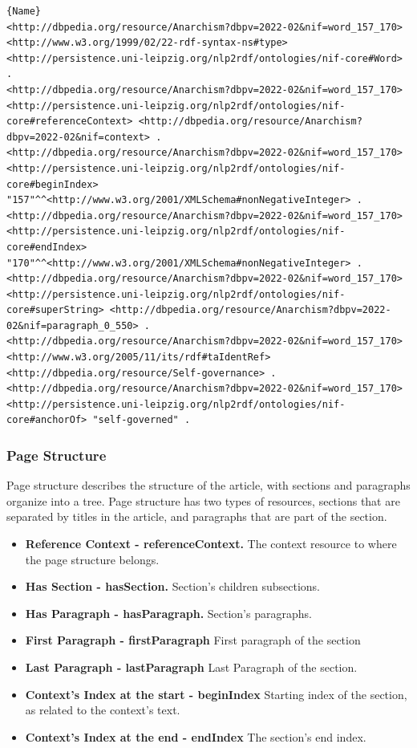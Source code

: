 \documentclass[thesis=M,english,hidelinks]{FITthesis}[2019/12/23]
\begin{document}
\begin{lstlisting}[caption=Example of an output for a Word link in NIF format,frame=tlrb,  label = {lst:nif-links}]{Name}
<http://dbpedia.org/resource/Anarchism?dbpv=2022-02&nif=word_157_170> <http://www.w3.org/1999/02/22-rdf-syntax-ns#type> <http://persistence.uni-leipzig.org/nlp2rdf/ontologies/nif-core#Word> .
<http://dbpedia.org/resource/Anarchism?dbpv=2022-02&nif=word_157_170> <http://persistence.uni-leipzig.org/nlp2rdf/ontologies/nif-core#referenceContext> <http://dbpedia.org/resource/Anarchism?dbpv=2022-02&nif=context> .
<http://dbpedia.org/resource/Anarchism?dbpv=2022-02&nif=word_157_170> <http://persistence.uni-leipzig.org/nlp2rdf/ontologies/nif-core#beginIndex> "157"^^<http://www.w3.org/2001/XMLSchema#nonNegativeInteger> .
<http://dbpedia.org/resource/Anarchism?dbpv=2022-02&nif=word_157_170> <http://persistence.uni-leipzig.org/nlp2rdf/ontologies/nif-core#endIndex> "170"^^<http://www.w3.org/2001/XMLSchema#nonNegativeInteger> .
<http://dbpedia.org/resource/Anarchism?dbpv=2022-02&nif=word_157_170> <http://persistence.uni-leipzig.org/nlp2rdf/ontologies/nif-core#superString> <http://dbpedia.org/resource/Anarchism?dbpv=2022-02&nif=paragraph_0_550> .
<http://dbpedia.org/resource/Anarchism?dbpv=2022-02&nif=word_157_170> <http://www.w3.org/2005/11/its/rdf#taIdentRef> <http://dbpedia.org/resource/Self-governance> .
<http://dbpedia.org/resource/Anarchism?dbpv=2022-02&nif=word_157_170> <http://persistence.uni-leipzig.org/nlp2rdf/ontologies/nif-core#anchorOf> "self-governed" .
\end{lstlisting}

\subsubsection{Page Structure}

Page structure describes the structure of the article, with sections and paragraphs organize into a tree. Page structure has two types of resources, sections that are separated by titles in the article, and paragraphs that are part of the section.

\begin{itemize}
	\item \textbf{Reference Context - referenceContext.} The context resource to where the page structure belongs.
	\item \textbf{Has Section - hasSection.} Section's children subsections.
	\item \textbf{Has Paragraph - hasParagraph.} Section's paragraphs.
	\item \textbf{First Paragraph - firstParagraph} First paragraph of the section
	\item \textbf{Last Paragraph - lastParagraph} Last Paragraph of the section.
	\item \textbf{Context's Index at the start - beginIndex} Starting index of the section, as related to the context's text.
	\item \textbf{Context's Index at the end - endIndex} The section's end index.
\end{itemize}
\end{document}
